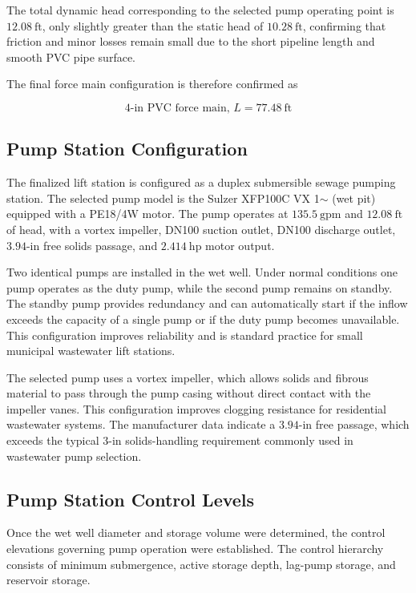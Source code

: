 The total dynamic head corresponding to the selected pump operating point is $12.08~\text{ft}$, only slightly greater than the static head of $10.28~\text{ft}$, confirming that friction and minor losses remain small due to the short pipeline length and smooth PVC pipe surface.

The final force main configuration is therefore confirmed as

\[
\boxed{\text{4-in PVC force main, } L = 77.48~\text{ft}}
\]

\subsection{Pump Station Configuration}

The finalized lift station is configured as a duplex submersible sewage pumping station. The selected pump model is the Sulzer XFP100C VX 1$\sim$ (wet pit) equipped with a PE18/4W motor. The pump operates at $135.5~\text{gpm}$ and $12.08~\text{ft}$ of head, with a vortex impeller, DN100 suction outlet, DN100 discharge outlet, $3.94$-in free solids passage, and $2.414~\text{hp}$ motor output.

Two identical pumps are installed in the wet well. Under normal conditions one pump operates as the duty pump, while the second pump remains on standby. The standby pump provides redundancy and can automatically start if the inflow exceeds the capacity of a single pump or if the duty pump becomes unavailable. This configuration improves reliability and is standard practice for small municipal wastewater lift stations.

The selected pump uses a vortex impeller, which allows solids and fibrous material to pass through the pump casing without direct contact with the impeller vanes. This configuration improves clogging resistance for residential wastewater systems. The manufacturer data indicate a $3.94$-in free passage, which exceeds the typical $3$-in solids-handling requirement commonly used in wastewater pump selection.

\subsection{Pump Station Control Levels}

Once the wet well diameter and storage volume were determined, the control elevations governing pump operation were established. The control hierarchy consists of minimum submergence, active storage depth, lag-pump storage, and reservoir storage.

